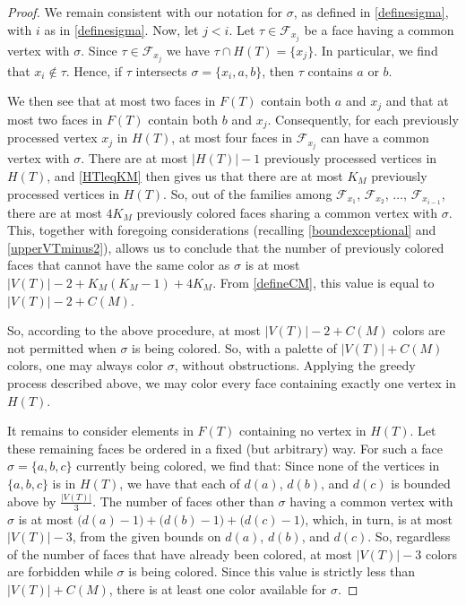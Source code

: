 \documentclass[10pt,a4paper]{amsart}
\begin{document}
\begin{proof}
 We remain consistent with our notation for $\sigma$, as defined in \eqref{definesigma}, with $i$ as in \eqref{definesigma}. Now, let
 $j < i$. Let $\tau \in \mathcal{F}_{x_{j}}$ be a face having a common vertex with $\sigma$. 
 Since $\tau \in \mathcal{F}_{x_j}$ we have $\tau \cap H(T) = \{ x_{j} \}$.
 In particular, we find that $x_i \not\in \tau$. 
 Hence, if $\tau$ intersects $\sigma = \{ x_i, a, b \}$, 
 then $\tau$ contains $a$ or $b$. 

 We then see that at most two faces in $F(T)$ contain both $a$ and $x_j$ and that at most two faces in $F(T)$ contain both $b$ and $x_j$. 
 Consequently, for each previously processed vertex $x_j$ in $H(T)$, at most four faces in $\mathcal{F}_{x_j}$ can have a common vertex 
 with $\sigma$. There are at most $|H(T)| - 1$ previously processed vertices in $H(T)$, 
 and \eqref{HTleqKM} then gives us that there are at most $K_M$ previously processed vertices in $H(T)$. 
 So, out of the families among $\mathcal{F}_{x_1}$, $\mathcal{F}_{x_2}$, $\ldots$, $\mathcal{F}_{x_{i-1}}$, 
 there are at most $4 K_M$ previously colored faces 
 sharing a common vertex with $\sigma$. 
 This, together with foregoing considerations (recalling \eqref{boundexceptional} and \eqref{upperVTminus2}), 
 allows us to conclude that the number of previously colored faces that cannot have the same color as $\sigma$
 is at most 
 $\left| V(T) \right| - 2 + K_{M} ( K_{M} - 1 ) + 4 K_M$. 
 From \eqref{defineCM}, this value is equal to 
 $\left| V(T) \right| - 2 + C(M)$. 

 So, according to the above procedure, at most $\left| V(T) \right| - 2 + C(M)$ colors are not permitted when $\sigma $ is being colored. 
 So, with a palette of $\left| V(T) \right| + C(M)$ colors, one may always color $\sigma$, without obstructions. Applying the greedy 
 process described above, 
 we may color every face containing exactly one vertex in $H(T)$. 
 
 It remains to consider elements in $F(T)$ containing no vertex in $H(T)$. Let these remaining faces be ordered in a fixed (but 
 arbitrary) way. For such a face $\sigma = \{ a, b, c \}$ currently being colored, 
 we find that: Since none of the vertices in $\{ a, b, c \}$ is in $H(T)$, 
 we have that each of $d(a)$, $d(b)$, and $d(c)$ is bounded above by $\frac{ \left| V(T) \right| }{3}$. 
 The number of faces other than $\sigma$ having a common vertex with $\sigma$ is at most 
 $\big( d(a) - 1 \big) + \big( d(b) - 1 \big) + \big( d(c) - 1 \big)$, 
 which, in turn, is at most $\left| V(T) \right| - 3$, from the given bounds on $d(a)$, $d(b)$, and $d(c)$. 
 So, regardless of the number of faces that have already been colored, 
 at most $\left| V(T) \right| - 3$ colors are forbidden while $\sigma$ is being colored. 
 Since this value is strictly less than $\left| V(T) \right| + C(M)$, there is at least one color available for $\sigma$. 
 

\end{proof}
\end{document}
